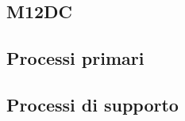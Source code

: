 {{{{{{{{{{{{{\subsection{M12DC}






\subsection{Processi primari}
    
   
\subsection{Processi di supporto}
\begin{comment}
    {\renewcommand{\arraystretch}{1.5}
    \begin{tabularx}{\textwidth}{p{0.05\textwidth}|p{0.35\textwidth}|X|X}
    \textbf{ID} & \textbf{Nome metrica} & \textbf{Valore accettabile} & \textbf{Valore ottimale}  \\
    \hline
    \multicolumn{4}{l}{\cellcolor{primarycolor}\textbf{\textit{Verifica}}} \\
    \hline
     &  &  &  \\
    \hline
     &  &  &  \\
    \hline
     &  &  &  \\
    \hline
     &  &  &  \\
    \hline
    \multicolumn{4}{l}{\cellcolor{primarycolor}\textbf{\textit{Gestione della qualità}}} \\
    \hline
     &  &  &  \\
    \end{tabularx}}  
  
\subsubsection{Documentazione}
    {\renewcommand{\arraystretch}{1.5}
    \begin{tabularx}{\textwidth}{p{0.15\textwidth}|p{0.35\textwidth}|X|X}
    \textbf{ID} & \textbf{Nome metrica} & \textbf{Valore accettabile} & \textbf{Valore ottimale}  \\
    \hline
    \multicolumn{4}{l}{\cellcolor{primarycolor}\textbf{\textit{Funzionalità}}} \\
    \hline
    MPD-CR & Copertura dei requisiti & 100 & 100 \\
    
    \hline
   

\end{comment}}}}}}}}}}}}}}
